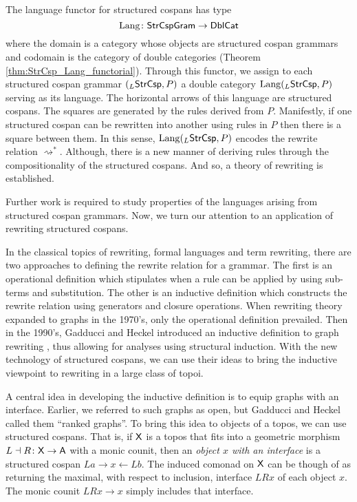 \documentclass[oneside]{amsart}
\begin{document}
The language functor for structured cospans has
type
$$ \mathrm{Lang} \colon \mathsf{StrCspGram} \to \mathsf{DblCat} $$ where the
domain is a category whose objects are structured
cospan grammars and codomain is the category of
double categories (Theorem
\ref{thm:StrCsp_Lang_functorial}). Through this
functor, we assign to each structured cospan
grammar $ ( _L\mathsf{StrCsp},P ) $ a double category
$ \mathrm{Lang} (_L\mathsf{StrCsp}, P) $ serving as its
language. The horizontal arrows of this language
are structured cospans.  The squares are generated
by the rules derived from $ P $. Manifestly, if
one structured cospan can be rewritten into
another using rules in $ P $ then there is a
square between them.  In this sense,
$ \mathrm{Lang} (_L\mathsf{StrCsp} , P) $ encodes the rewrite
relation $ \rightsquigarrow^\ast $.  Although,
there is a new manner of deriving rules through
the compositionality of the structured cospans.
And so, a theory of rewriting is established.

Further work is required to study properties of
the languages arising from structured cospan
grammars. Now, we turn our attention to an
application of rewriting structured cospans.

In the classical topics of rewriting, formal
languages and term rewriting, there are two
approaches to defining the rewrite relation for a
grammar. The first is an operational definition
which stipulates when a rule can be applied by
using sub-terms and substitution.  The other is an
inductive definition which constructs the rewrite
relation using generators and closure
operations. When rewriting theory expanded to
graphs in the 1970's, only the operational
definition prevailed.  Then in the 1990's, Gadducci
and Heckel introduced an inductive definition to
graph rewriting
\parencite{Gadd_IndGraphTrans}, thus allowing for
analyses using structural induction. With the new
technology of structured cospans, we can use their
ideas to bring the inductive viewpoint to
rewriting in a large class of topoi.

A central idea in developing the inductive
definition is to equip graphs with an
interface. Earlier, we referred to such graphs as
open, but Gadducci and Heckel called them ``ranked
graphs''.  To bring this idea to objects of a
topos, we can use structured cospans. That is, if
$ \mathsf{X} $ is a topos that fits into a geometric
morphism $ L \dashv R \colon \mathsf{X} \to \mathsf{A} $ with a
monic counit, then an \emph{object $ x $ with an
interface} is a structured cospan $ La \to x \gets
Lb$. The induced comonad on $ \mathsf{X} $ can be though
of as returning the maximal, with respect to
inclusion, interface $ LRx $ of each object $ x
$. The monic counit $ LRx \to x $ simply includes
that interface.
\end{document}
